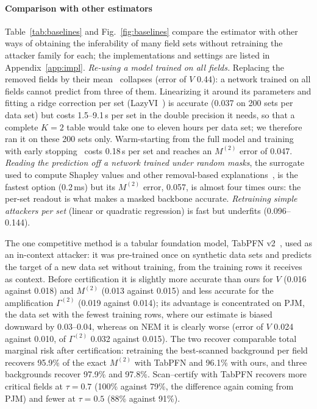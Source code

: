 \paragraph{Comparison with other estimators}
Table~\ref{tab:baselines} and Fig.~\ref{fig:baselines} compare the estimator with other ways of obtaining the
inferability of many field sets without retraining the attacker family for each; the implementations and settings are listed in Appendix~\ref{app:impl}.
\emph{Re-using a model trained on all fields.} Replacing the removed fields by their mean~\cite{williamson2020spvim}
collapses (error of $V$ 0.44): a network trained on all fields cannot predict from three of them. Linearizing it around its
parameters and fitting a ridge correction per set (LazyVI~\cite{gao2022lazyvi}) is accurate (0.037 on 200 sets per data set)
but costs 1.5--9.1\,s per set in the double precision it needs, so that a complete $K=2$ table would take one to eleven hours
per data set; we therefore ran it on these 200 sets only. Warm-starting from the full model and training with early
stopping~\cite{sun2025warmstart} costs 0.18\,s per set and reaches an $M^{(2)}$ error of 0.047. \emph{Reading the prediction
off a network trained under random masks}, the surrogate used to compute Shapley values and other removal-based
explanations~\cite{covert2021explaining,jethani2022fastshap}, is the fastest option (0.2\,ms) but its $M^{(2)}$ error, 0.057, is
almost four times ours: the per-set readout is what makes a masked backbone accurate. \emph{Retraining simple attackers per
set} (linear or quadratic regression) is fast but underfits (0.096--0.144).

The one competitive method is a tabular foundation model, TabPFN v2~\cite{hollmann2025tabpfn}, used as an in-context
attacker: it was pre-trained once on synthetic data sets and predicts the target of a new data set without training, from the
training rows it receives as context. Before certification it is slightly more accurate than ours for $V$ (0.016 against
0.018) and $M^{(2)}$ (0.013 against 0.015) and less accurate for the amplification $\Gamma^{(2)}$ (0.019 against 0.014); its
advantage is concentrated on PJM, the data set with the fewest training rows, where our estimate is biased downward by
0.03--0.04, whereas on NEM it is clearly worse (error of $V$ 0.024 against 0.010, of $\Gamma^{(2)}$ 0.032 against 0.015). The two recover comparable total marginal risk after certification: retraining the best-scanned background per field recovers 95.9\% of the exact
$M^{(2)}$ with TabPFN and 96.1\% with ours, and three backgrounds recover 97.9\% and 97.8\%. Scan--certify with TabPFN recovers
more critical fields at $\tau=0.7$ (100\% against 79\%, the difference again coming from PJM) and fewer at $\tau=0.5$ (88\%
against 91\%).

